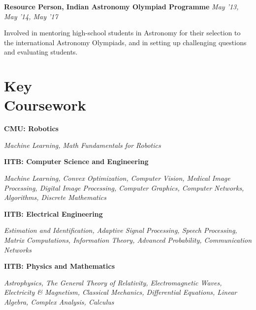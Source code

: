 \documentclass[margin,line]{res}
\newenvironment{list1}{
  \begin{list}{\ding{113}}{%
      \setlength{\itemsep}{0in}
      \setlength{\parsep}{0in} \setlength{\parskip}{0in}
      \setlength{\topsep}{0in} \setlength{\partopsep}{0in} 
      \setlength{\leftmargin}{0.17in}}}{\end{list}}
\begin{document}
\begin{resume}
\vspace*{-0.1in}

\textbf{Resource Person, Indian Astronomy Olympiad Programme} \hfill \textit{May '13, May '14, May '17} \\
\vspace*{-.15in}
\begin{list1}
\item[] Involved in mentoring high-school students in Astronomy for their selection to the international Astronomy Olympiads, and in setting up challenging questions and evaluating students.
\end{list1}


\section{\sc Key \\Coursework} 
\begin{list1}
\item[\strut\hspace{0.5cm}\hypertarget{crselst}{\textbf{CMU: Robotics}}]
\item[]\textit{Machine Learning, Math Fundamentals for Robotics}
\item[\strut\hspace{0.5cm}\hypertarget{crselst}{\textbf{IITB: Computer Science and Engineering}}]
\item[]\textit{Machine Learning, Convex Optimization, Computer Vision, Medical Image Processing, Digital Image Processing, Computer Graphics, Computer Networks, Algorithms, Discrete Mathematics}
\item[\strut\hspace{0.5cm}\textbf{IITB: Electrical Engineering}]
\vspace{0.05in}
\item[]\textit{Estimation and Identification, Adaptive Signal Processing, Speech Processing, Matrix Computations, Information Theory, Advanced Probability, Communication Networks}
\item[\strut\hspace{0.5cm}\textbf{IITB: Physics and Mathematics}]
\vspace{0.05in}
\item[]\textit{Astrophysics, The General Theory of Relativity, Electromagnetic Waves, Electricity \& Magnetism, Classical Mechanics, Differential Equations, Linear Algebra, Complex Analysis, Calculus}
\end{list1}


\end{resume}
\end{document}
